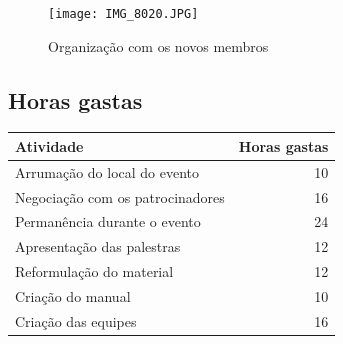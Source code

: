\documentclass[a0,portrait]{a0poster}
\begin{document}
\begin{multicols}{2}
\begin{figure}[H]
    \centering
    \texttt{[image: IMG\_8020.JPG]}
    \caption{Organização com os novos membros}
\end{figure}

\begin{tcolorbox}[ breakable,
                   coltext=white,
                   colback=DeepOrange,
                   colframe=DeepOrange,
                   width=36cm,
                   top=0.3cm,
                   bottom=0.4cm,
                   enlarge left by=-6mm]
    \section*{Horas gastas}
\end{tcolorbox}

\begin{table}[H]
\centering
\label{my-label}
\begin{tabular}{|l|r|}
\hline
\textbf{Atividade}               & \multicolumn{1}{l|}{\textbf{Horas gastas}} \\ \hline
Arrumação do local do evento     & 10                                         \\ \hline
Negociação com os patrocinadores & 16                                         \\ \hline
Permanência durante o evento     & 24                                         \\ \hline
Apresentação das palestras       & 12                                         \\ \hline
Reformulação do material         & 12                                         \\ \hline
Criação do manual                & 10                                         \\ \hline
Criação das equipes              & 16                                         \\ \hline
\end{tabular}
\end{table}

\end{multicols}
\end{document}
